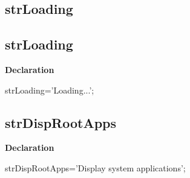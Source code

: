 \documentclass{report}
\newif\ifpdf
\begin{document}
\subsection*{\large{\textbf{strLoading}}\normalsize\hspace{1ex}\hrulefill}
\else
\subsection*{strLoading}
\fi
\label{trstrings-strLoading}
\begin{list}{}{
\setlength{\itemindent}{0cm}
\setlength{\listparindent}{0cm}
\setlength{\leftmargin}{\evensidemargin}
\addtolength{\leftmargin}{\tmplength}
\settowidth{\labelsep}{X}
\addtolength{\leftmargin}{\labelsep}
\setlength{\labelwidth}{\tmplength}
}
\item[\textbf{Declaration}\hfill]
\ifpdf
\begin{flushleft}
\fi
\begin{ttfamily}
strLoading='Loading...';\end{ttfamily}

\ifpdf
\end{flushleft}
\fi

\end{list}
\ifpdf
\subsection*{\large{\textbf{strDispRootApps}}\normalsize\hspace{1ex}\hrulefill}
\else
\subsection*{strDispRootApps}
\fi
\label{trstrings-strDispRootApps}
\begin{list}{}{
\setlength{\itemindent}{0cm}
\setlength{\listparindent}{0cm}
\setlength{\leftmargin}{\evensidemargin}
\addtolength{\leftmargin}{\tmplength}
\settowidth{\labelsep}{X}
\addtolength{\leftmargin}{\labelsep}
\setlength{\labelwidth}{\tmplength}
}
\item[\textbf{Declaration}\hfill]
\ifpdf
\begin{flushleft}
\fi
\begin{ttfamily}
strDispRootApps='Display system applications';\end{ttfamily}

\ifpdf
\end{flushleft}
\fi

\end{list}
\ifpdf
\end{document}
